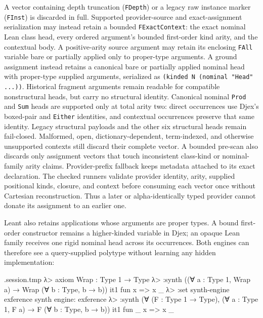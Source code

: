 \documentclass[11pt,oneside]{article}
\newcommand{\code}[1]{\texttt{#1}}
\newenvironment{session}
 {\VerbatimEnvironment\begin{VerbatimOut}{\jobname.session.tmp}}
 {\end{VerbatimOut}%
  \begin{sessionouter}%
  \VerbatimInput[fontsize=\footnotesize, breaklines=true,
    breaksymbolleft={\textcolor{stone}{\footnotesize$\hookrightarrow$}},
    formatcom=\color{ink}, tabsize=4]{\jobname.session.tmp}%
  \end{sessionouter}}
\begin{document}
A vector containing depth truncation (\code{FDepth}) or a legacy raw instance
marker (\code{FInst}) is discarded in full. Supported provider-source and
exact-assignment serialization may instead retain a bounded
\code{FExactContext}: the exact nominal Lean class head, every ordered
argument's bounded first-order kind arity, and the contextual body. A
positive-arity source argument may retain its enclosing \code{FAll} variable
bare or partially applied only to proper-type arguments. A ground assignment
instead retains a canonical bare or partially applied nominal head with
proper-type supplied arguments, serialized as
\code{(kinded N (nominal "Head" ...))}. Historical fragment arguments remain
readable for compatible nonstructural heads, but carry no structural identity.
Canonical nominal \code{Prod} and \code{Sum} heads are supported only at total
arity two: direct occurrences use Djex's boxed-pair and \code{Either}
identities, and contextual occurrences preserve that same identity. Legacy
structural payloads and the other six structural heads remain fail-closed.
Malformed, open, dictionary-dependent, term-indexed, and otherwise unsupported
contexts still discard their complete vector. A bounded pre-scan
also discards only assignment vectors that touch inconsistent class-kind or
nominal-family arity claims. Provider-prefix fallback keeps metadata attached
to its exact declaration. The checked runners validate provider identity,
arity, supplied positional kinds, closure, and context before consuming each
vector once without Cartesian reconstruction. Thus a later or
alpha-identically typed provider cannot donate its assignment to an earlier
one.

Leant also retains applications whose arguments are proper types. A bound
first-order constructor remains a higher-kinded variable in Djex; an opaque
Lean family receives one rigid nominal head across its occurrences. Both
engines can therefore see a query-supplied polytype without learning any hidden
implementation:

\begin{session}
λ> axiom Wrap : Type 1 → Type
λ> :synth ((∀ a : Type 1, Wrap a) → Wrap (∀ b : Type, b → b))
  it1  fun x => x _
λ> :set synth-engine exference
synth engine: exference
λ> :synth (∀ (F : Type 1 → Type), (∀ a : Type 1, F a) → F (∀ b : Type, b → b))
  it1  fun _ x => x _
\end{session}
\end{document}
